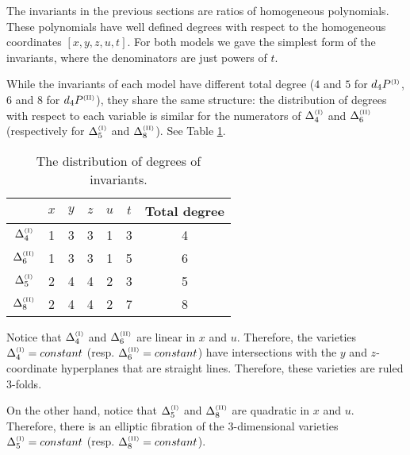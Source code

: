 \documentclass[reqno]{amsart}
\numberwithin{equation}{section}
\numberwithin{figure}{section}
\begin{document}
The invariants in the previous sections are ratios of homogeneous
polynomials. These polynomials have well defined degrees with respect
to the homogeneous coordinates $[x,y,z,u,t]$. For both models we gave
the simplest form of the invariants, where the denominators are just
powers of $t$.

While the invariants of each model have different total degree ($4$
and $5$ for $d_4P^{\scriptscriptstyle(\rm I)}$, $6$ and $8$ for
$d_4P^{\scriptscriptstyle(\rm II)}$), they share the same structure:
the distribution of degrees with respect to each variable is similar
for the numerators of $\Delta_4^{\scriptscriptstyle(\rm I)}$ and
$\Delta_6^{\scriptscriptstyle(\rm II)}$ (respectively for
$\Delta_5^{\scriptscriptstyle(\rm I)}$ and
$\Delta_8^{\scriptscriptstyle(\rm II)}$). See Table \ref{tab1}.

\begin{table}[H]
\begin{center}
\label{degrees}
\begin{tabular}{|c| cccc| c |c|} 
\hline
 &  $x$ & $y$ & $z$ & $u$ & $t$ & Total degree \\
\hline
 $\Delta_4^{\scriptscriptstyle(\rm I)}$& 1 & 3 & 3 & 1 & 3 & 4 \\
 $\Delta_6^{\scriptscriptstyle(\rm II)}$& 1 & 3 & 3 & 1 & 5 & 6 \\
\hline
 $\Delta_5^{\scriptscriptstyle(\rm I)}$& 2 & 4 & 4 & 2 & 3 & 5 \\
 $\Delta_8^{\scriptscriptstyle(\rm II)}$& 2 & 4 & 4 & 2 & 7 & 8 \\
\hline
\end{tabular}
\end{center}
\caption{The distribution of degrees of invariants.}
\label{tab1}
\end{table}

Notice that $\Delta_4^{\scriptscriptstyle(\rm I)}$ and $\Delta_6^{\scriptscriptstyle(\rm II)}$ are linear in $x$ and $u$. Therefore, the varieties $\Delta_4^{\scriptscriptstyle(\rm I)} = constant$ (resp.
$\Delta_6^{\scriptscriptstyle(\rm II)} = constant$) have intersections with the $y$ and $z$-coordinate hyperplanes that are straight lines. Therefore, these varieties are ruled 3-folds. 

On the other hand, notice that $\Delta_5^{\scriptscriptstyle(\rm I)}$ and $\Delta_8^{\scriptscriptstyle(\rm II)}$ are quadratic in $x$ and $u$. 
Therefore, there is an elliptic fibration of
the 3-dimensional varieties $\Delta_5^{\scriptscriptstyle(\rm I)} = constant$ (resp.
$\Delta_8^{\scriptscriptstyle(\rm II)} = constant$).
\end{document}
